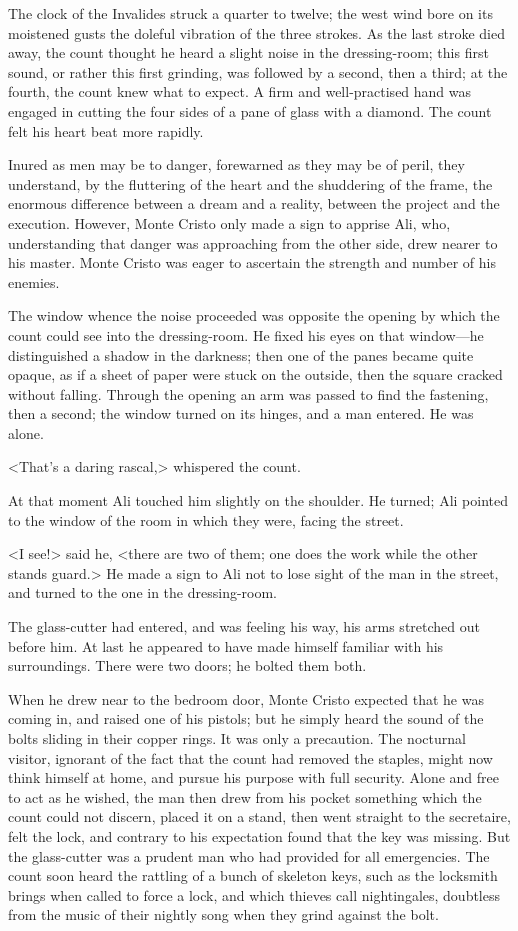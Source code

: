  The clock of the Invalides struck a quarter to twelve; the west wind bore on its moistened gusts the doleful vibration of the three strokes.  As the last stroke died away, the count thought he heard a slight noise in the dressing-room; this first sound, or rather this first grinding, was followed by a second, then a third; at the fourth, the count knew what to expect. A firm and well-practised hand was engaged in cutting the four sides of a pane of glass with a diamond. The count felt his heart beat more rapidly. 

 Inured as men may be to danger, forewarned as they may be of peril, they understand, by the fluttering of the heart and the shuddering of the frame, the enormous difference between a dream and a reality, between the project and the execution. However, Monte Cristo only made a sign to apprise Ali, who, understanding that danger was approaching from the other side, drew nearer to his master. Monte Cristo was eager to ascertain the strength and number of his enemies. 

 The window whence the noise proceeded was opposite the opening by which the count could see into the dressing-room. He fixed his eyes on that window—he distinguished a shadow in the darkness; then one of the panes became quite opaque, as if a sheet of paper were stuck on the outside, then the square cracked without falling. Through the opening an arm was passed to find the fastening, then a second; the window turned on its hinges, and a man entered. He was alone. 

 <That's a daring rascal,> whispered the count. 

 At that moment Ali touched him slightly on the shoulder. He turned; Ali pointed to the window of the room in which they were, facing the street. 

 <I see!> said he, <there are two of them; one does the work while the other stands guard.> He made a sign to Ali not to lose sight of the man in the street, and turned to the one in the dressing-room. 

 The glass-cutter had entered, and was feeling his way, his arms stretched out before him. At last he appeared to have made himself familiar with his surroundings. There were two doors; he bolted them both. 

 When he drew near to the bedroom door, Monte Cristo expected that he was coming in, and raised one of his pistols; but he simply heard the sound of the bolts sliding in their copper rings. It was only a precaution. The nocturnal visitor, ignorant of the fact that the count had removed the staples, might now think himself at home, and pursue his purpose with full security. Alone and free to act as he wished, the man then drew from his pocket something which the count could not discern, placed it on a stand, then went straight to the secretaire, felt the lock, and contrary to his expectation found that the key was missing. But the glass-cutter was a prudent man who had provided for all emergencies. The count soon heard the rattling of a bunch of skeleton keys, such as the locksmith brings when called to force a lock, and which thieves call nightingales, doubtless from the music of their nightly song when they grind against the bolt. 

